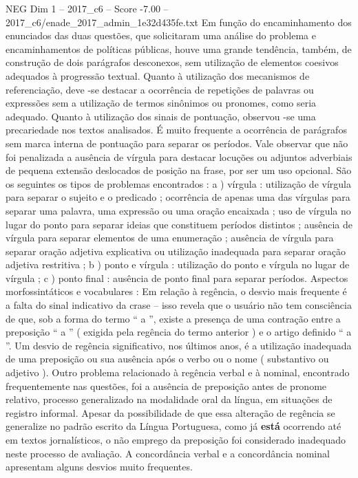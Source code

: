 \begin{textsample}{NEG Dim 1 – 2017\_c6 – Score -7.00 – 2017\_c6/enade\_2017\_admin\_1e32d435fe.txt}
Em função do encaminhamento dos enunciados das duas questões, que solicitaram uma análise do problema e encaminhamentos de políticas públicas, houve uma grande tendência, também, de construção de dois parágrafos desconexos, sem utilização de elementos coesivos adequados à progressão textual.
Quanto à utilização dos mecanismos de referenciação, deve -se destacar a ocorrência de repetições de palavras ou expressões sem a utilização de termos sinônimos ou pronomes, como seria adequado.
Quanto à utilização dos sinais de pontuação, observou -se uma precariedade nos textos analisados.
É muito frequente a ocorrência de parágrafos sem marca interna de pontuação para separar os períodos.
Vale observar que não foi penalizada a ausência de vírgula para destacar locuções ou adjuntos adverbiais de pequena extensão deslocados de posição na frase, por ser um uso opcional.
São os seguintes os tipos de problemas encontrados : a ) vírgula : utilização de vírgula para separar o sujeito e o predicado ; ocorrência de apenas uma das vírgulas para separar uma palavra, uma expressão ou uma oração encaixada ; uso de vírgula no lugar do ponto para separar ideias que constituem períodos distintos ; ausência de vírgula para separar elementos de uma enumeração ; ausência de vírgula para separar oração adjetiva explicativa ou utilização inadequada para separar oração adjetiva restritiva ; b ) ponto e vírgula : utilização do ponto e vírgula no lugar de vírgula ; c ) ponto final : ausência de ponto final para separar períodos.
Aspectos morfossintáticos e vocabulares : Em relação à regência, o desvio mais frequente é a falta do sinal indicativo da crase – isso revela que o usuário não tem consciência de que, sob a forma do termo “ a ”, existe a presença de uma contração entre a preposição “ a ” ( exigida pela regência do termo anterior ) e o artigo definido “ a ”.
Um desvio de regência significativo, nos últimos anos, é a utilização inadequada de uma preposição ou sua ausência após o verbo ou o nome ( substantivo ou adjetivo ).
Outro problema relacionado à regência verbal e à nominal, encontrado frequentemente nas questões, foi a ausência de preposição antes de pronome relativo, processo generalizado na modalidade oral da língua, em situações de registro informal.
Apesar da possibilidade de que essa alteração de regência se generalize no padrão escrito da Língua Portuguesa, como já \textbf{está} ocorrendo até em textos jornalísticos, o não emprego da preposição foi considerado inadequado neste processo de avaliação.
A concordância verbal e a concordância nominal apresentam alguns desvios muito frequentes.

\end{textsample}
